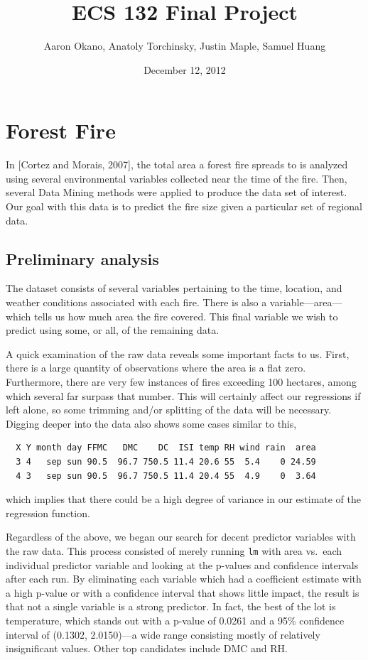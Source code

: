 \documentclass{article}
\title{ECS 132 Final Project}  %
\author{Aaron Okano, Anatoly Torchinsky, Justin Maple, Samuel Huang }    %
\date{December 12, 2012}   %
\begin{document}

\maketitle                 %



\section{Forest Fire}

In [Cortez and Morais, 2007], the total area a forest fire spreads to is
analyzed using several environmental variables collected near the time of the
fire. Then, several Data Mining methods were applied to produce the data set
of interest. Our goal with this data is to predict the fire size given a
particular set of regional data.

\subsection{Preliminary analysis}

The dataset consists of several variables pertaining to the time, location, and
weather conditions associated with each fire. There is also a
variable---area---which tells us how much area the fire covered. This final
variable we wish to predict using some, or all, of the remaining data.

A quick examination of the raw data reveals some important facts to us. First,
there is a large quantity of observations where the area is a flat zero.
Furthermore, there are very few instances of fires exceeding 100 hectares,
among which several far surpass that number. This will certainly affect our
regressions if left alone, so some trimming and/or splitting of the data will
be necessary. Digging deeper into the data also shows some cases similar to
this,
\begin{verbatim}
  X Y month day FFMC   DMC    DC  ISI temp RH wind rain  area
  3 4   sep sun 90.5  96.7 750.5 11.4 20.6 55  5.4    0 24.59
  4 3   sep sun 90.5  96.7 750.5 11.4 20.4 55  4.9    0  3.64
\end{verbatim}
which implies that there could be a high degree of variance in our estimate of
the regression function.

Regardless of the above, we began our search for decent predictor variables
with the raw data. This process consisted of merely running \verb=lm= with area
vs.\ each individual predictor variable and looking at the p-values and
confidence intervals after each run. By eliminating each variable which had a
coefficient estimate with a high p-value or with a confidence interval that
shows little impact, the result is that not a single variable is a strong
predictor. In fact, the best of the lot is temperature, which stands out with a
p-value of 0.0261 and a 95\% confidence interval of (0.1302, 2.0150)---a
wide range consisting mostly of relatively insignificant values. Other top
candidates include DMC and RH.
\end{document}
